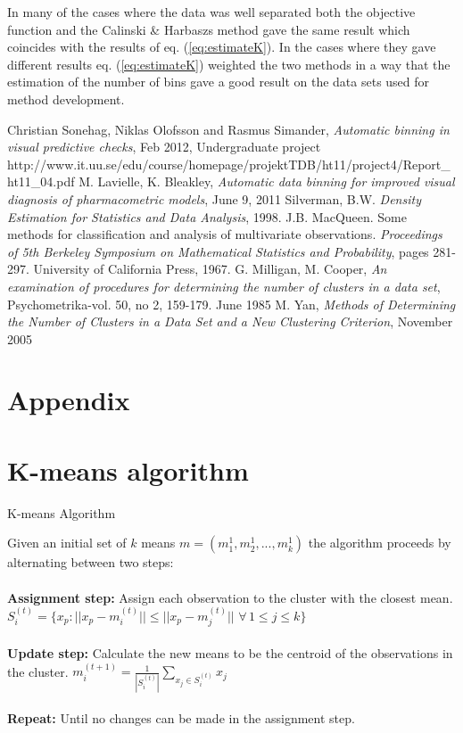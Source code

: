 In many of the cases where the data was well separated both the objective function and the Calinski \& Harbaszs method gave the same result which coincides with the results of eq. (\ref{eq:estimateK}). In the cases where they gave different results eq. (\ref{eq:estimateK}) weighted the two methods in a way that the estimation of the number of bins gave a good result on the data sets used for method development.

\begin{thebibliography}{99}
	 Christian Sonehag, Niklas Olofsson and Rasmus Simander, {\em Automatic binning in visual predictive checks}, Feb 2012, Undergraduate project http://www.it.uu.se/edu/course/homepage/projektTDB/ht11/project4/Report\_ht11\_04.pdf
  M. Lavielle, K. Bleakley, {\em Automatic data binning for improved visual diagnosis of pharmacometric models}, June 9, 2011
  Silverman, B.W. {\em Density Estimation for Statistics and Data Analysis}, 1998.
  J.B. MacQueen. Some methods for classification and analysis of multivariate observations. {\em Proceedings of 5th Berkeley Symposium on Mathematical Statistics and Probability}, pages 281-297. University of California Press, 1967.
  G. Milligan, M. Cooper, {\em An examination of procedures for determining the number of clusters in a data set}, Psychometrika-vol. 50, no 2, 159-179. June 1985
  M. Yan, {\em Methods of Determining the Number of Clusters in a Data Set and a New Clustering Criterion}, November 2005
\end{thebibliography}


\appendix
\section*{Appendix}
\section{K-means algorithm}
\begin{algorithm}
	\caption{K-means Algorithm}
	Given an initial set of $k$ means $m = (m_1^1, m_2^1, ..., m_k^1)$ the algorithm proceeds by alternating between two steps:
	\\ 
	\\
	{\bf Assignment step: } Assign each observation to the cluster with the closest mean.
	$S_i^{(t)} = \{ x_p : || x_p - m_i^{(t)} || \leq || x_p - m_j^{(t)} || \,\, \forall \, 1 \leq j \leq k \}$ 
	\\
	\\
	{\bf Update step: } Calculate the new means to be the centroid of the observations in the cluster.
	$m_i^{(t+1)} = \frac{1}{| S_i^{(t)} |} \sum_{x_j \in S_i^{(t)}} x_j$
	\\
	\\
	{\bf Repeat: } Until no changes can be made in the assignment step.


\label{kmeans}
	   
\end{algorithm}


